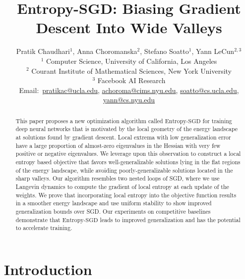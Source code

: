 \documentclass[10pt]{article}
\title{Entropy-SGD: Biasing Gradient Descent Into Wide Valleys}
\author{Pratik Chaudhari$^{1}$, Anna Choromanska$^{2}$, Stefano Soatto$^{1}$, Yann LeCun$^{2,3}$\\[0.05in]
$^{1}$ Computer Science, University of California, Los Angeles\\
$^{2}$ Courant Institute of Mathematical Sciences, New York University\\
$^{3}$ Facebook AI Research\\[0.05in]
{\footnotesize
Email:\ \href{mailto:pratikac@ucla.edu}{pratikac@ucla.edu},
\href{mailto:achoroma@cims.nyu.edu}{achoroma@cims.nyu.edu},
\href{mailto:soatto@cs.ucla.edu}{soatto@cs.ucla.edu},
\href{mailto:yann@cs.nyu.edu}{yann@cs.nyu.edu}}
}
\newcommand{\entropysgd}{\mathrm{Entropy}\textrm{-}\mathrm{SGD}}
\begin{document}
\maketitle

\begin{abstract}
This paper proposes a new optimization algorithm called $\entropysgd$ for training deep neural networks that is motivated by the local geometry of the energy landscape at solutions found by gradient descent. Local extrema with low generalization error have a large proportion of almost-zero eigenvalues in the Hessian with very few positive or negative eigenvalues. We leverage upon this observation to construct a local entropy based objective that favors well-generalizable solutions lying in the flat regions of the energy landscape, while avoiding poorly-generalizable solutions located in the sharp valleys.
%
Our algorithm resembles two nested loops of SGD, where we use Langevin dynamics to compute the gradient of local entropy at each update of the weights.
%
We prove that incorporating local entropy into the objective function results in a smoother energy landscape and use uniform stability to show improved generalization bounds over SGD.
%
Our experiments on competitive baselines demonstrate that $\entropysgd$ leads to improved generalization and has the potential to accelerate training.
\end{abstract}

\section{Introduction}
\label{s:intro}
\end{document}
